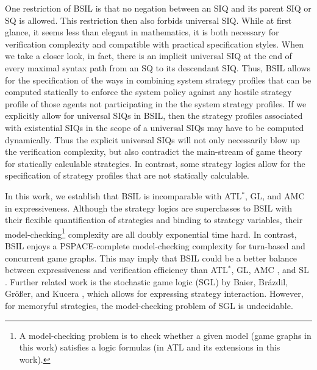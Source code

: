 \documentclass[11pt]{article}
\begin{document}
One restriction of BSIL is that no negation between an SIQ and its parent SIQ or SQ is allowed. 
This restriction then also forbids universal SIQ.  
While at first glance, it seems less than elegant in mathematics, 
it is both necessary for verification complexity and 
compatible with practical specification styles.  
When we take a closer look, in fact, there is an implicit universal SIQ 
at the end of every maximal syntax path from an SQ to its descendant SIQ.  
Thus, BSIL allows for the specification of the ways in combining system strategy profiles that 
can be computed statically to enforce the system policy against 
any hostile strategy profile of those agents not participating in the the system strategy 
profiles.  
If we explicitly allow for universal SIQs in BSIL, 
then the strategy profiles associated with existential SIQs in the scope of a universal SIQs 
may have to be computed dynamically.  
Thus the explicit universal SIQs will not only necessarily blow up the verification complexity, 
but also contradict the main-stream of game theory for statically calculable strategies.  
In contrast, some strategy logics \cite{MMV10} 
allow for the specification of strategy profiles that are not statically calculable.  

In this work, 
we establish that BSIL is incomparable with ATL$^*$, GL, and AMC 
in expressiveness.  
Although the strategy logics \cite{CHP10,CLM10,MMV10} are superclasses to BSIL  
with their flexible quantification of 
strategies and binding to strategy variables, 
their model-checking\footnote{A 
model-checking problem is to check whether a given model 
(game graphs in this work) satisfies a logic formulas 
(in ATL and its extensions in this work).}  
complexity are all doubly exponential time hard.  
In contrast, BSIL enjoys a PSPACE-complete model-checking complexity for 
turn-based and concurrent game graphs.  
This may imply that BSIL could be a better balance between 
expressiveness and verification efficiency 
than ATL$^*$, GL, AMC \cite{AHK02}, and SL \cite{CHP10,MMV10}.
Further related work is the stochastic game logic (SGL) by Baier, Br\'azdil,
Gr\"o{\ss}er, and Kucera \cite{BBGK07}, which allows for expressing strategy interaction.
However, for memoryful strategies, the model-checking problem of SGL is undecidable. 
\end{document}
